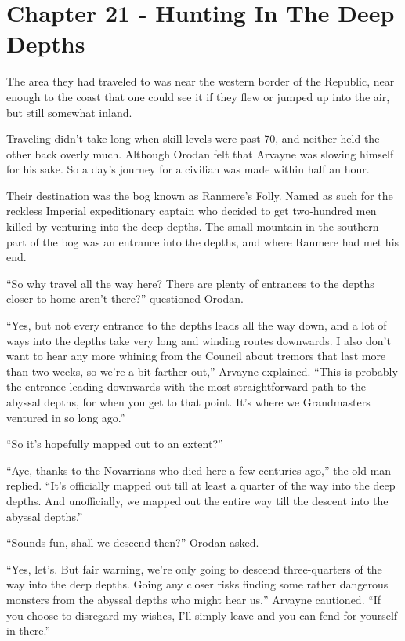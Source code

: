 \documentclass[a4paper,10pt]{book}
\begin{document}
\section*{Chapter 21 - Hunting In The Deep Depths}
%
\par
The area they had traveled to was near the western border of the Republic, near enough to the coast that one could see it if they flew or jumped up into the air, but still somewhat inland.\par
Traveling didn’t take long when skill levels were past 70, and neither held the other back overly much. Although Orodan felt that Arvayne was slowing himself for his sake. So a day’s journey for a civilian was made within half an hour.\par
Their destination was the bog known as Ranmere’s Folly. Named as such for the reckless Imperial expeditionary captain who decided to get two-hundred men killed by venturing into the deep depths. The small mountain in the southern part of the bog was an entrance into the depths, and where Ranmere had met his end.\par
“So why travel all the way here? There are plenty of entrances to the depths closer to home aren’t there?” questioned Orodan.\par
“Yes, but not every entrance to the depths leads all the way down, and a lot of ways into the depths take very long and winding routes downwards. I also don’t want to hear any more whining from the Council about tremors that last more than two weeks, so we're a bit farther out,” Arvayne explained. “This is probably the entrance leading downwards with the most straightforward path to the abyssal depths, for when you get to that point. It’s where we Grandmasters ventured in so long ago.”\par
“So it’s hopefully mapped out to an extent?”\par
“Aye, thanks to the Novarrians who died here a few centuries ago,” the old man replied. “It’s officially mapped out till at least a quarter of the way into the deep depths. And unofficially, we mapped out the entire way till the descent into the abyssal depths.”\par
“Sounds fun, shall we descend then?” Orodan asked.\par
“Yes, let’s. But fair warning, we’re only going to descend three-quarters of the way into the deep depths. Going any closer risks finding some rather dangerous monsters from the abyssal depths who might hear us,” Arvayne cautioned. “If you choose to disregard my wishes, I’ll simply leave and you can fend for yourself in there.”\par
\end{document}
